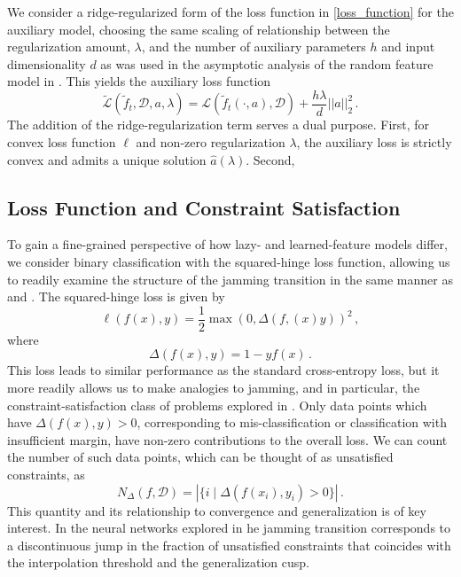 \documentclass[a4paper, 11pt]{article}
\begin{document}
We consider a ridge-regularized form of the loss function in \eqref{loss_function} for the auxiliary model, choosing the same scaling of relationship between the regularization amount, $\lambda$, and the number of auxiliary parameters $h$ and input dimensionality $d$ as was used in the asymptotic analysis of the random feature model in \cite{meiGeneralizationErrorRandom2019}. This yields the auxiliary loss function
\begin{equation}
    \tilde{\mathcal{L}} (\tilde f_t, \mathcal D, a, \lambda) = \mathcal L (\tilde f_t(\cdot, a), \mathcal D) + \frac{h \lambda}{d} ||a||_2^2\,.
\end{equation}
The addition of the ridge-regularization term serves a dual purpose. First, for convex loss function $\ell$ and non-zero regularization $\lambda$, the auxiliary loss is strictly convex and admits a unique solution $\hat a(\lambda)$. Second, 

\subsection{Loss Function and Constraint Satisfaction}

To gain a fine-grained perspective of how lazy- and learned-feature models differ, we consider binary classification with the squared-hinge loss function, allowing us to readily examine the structure of the jamming transition in the same manner as \cite{geigerJammingTransitionParadigm2019} and \cite{spiglerJammingTransitionOverparametrization2019}. The squared-hinge loss is given by
\begin{equation}
    \ell(f(x), y) = \frac{1}{2}\max(0, \Delta(f,(x) y))^2\,,
\end{equation}
where
\begin{equation}
    \Delta(f(x), y) = 1 - yf(x)\,.
\end{equation}
This loss leads to similar performance as the standard cross-entropy loss, but it more readily allows us to make analogies to jamming, and in particular, the constraint-satisfaction class of problems explored in \cite{krzakalaLandscapeAnalysisConstraint2007}. Only data points which have $\Delta(f(x), y) > 0$, corresponding to mis-classification or classification with insufficient margin, have non-zero contributions to the overall loss. We can count the number of such data points, which can be thought of as unsatisfied constraints, as 
\begin{equation}
    N_\Delta(f, \mathcal D) = \left|\{i \mid \Delta(f(x_i), y_i) > 0 \}\right|\,.
\end{equation}
This quantity and its relationship to convergence and generalization is of key interest. In the neural networks explored in he jamming transition corresponds to a discontinuous jump in the fraction of unsatisfied constraints that coincides with the interpolation threshold and the generalization cusp.
\end{document}
